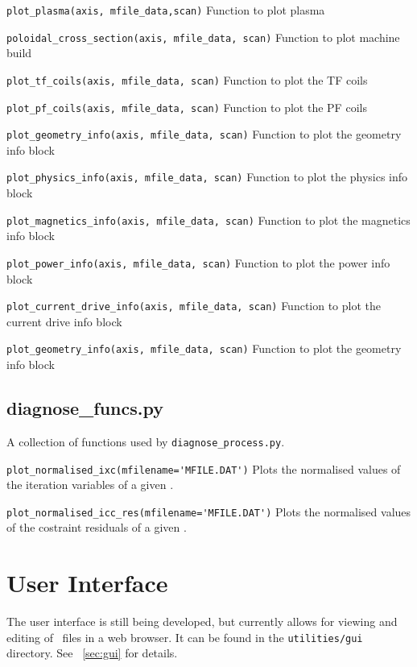 \begin{description}

\item{\verb|plot_plasma(axis, mfile_data,scan)|} Function to plot plasma

\item{\verb|poloidal_cross_section(axis, mfile_data, scan)|} Function to plot machine build

\item{\verb|plot_tf_coils(axis, mfile_data, scan)|} Function to plot the TF coils

\item{\verb|plot_pf_coils(axis, mfile_data, scan)|} Function to plot the PF coils

\item{\verb|plot_geometry_info(axis, mfile_data, scan)|} Function to plot the
  geometry info block

\item{\verb|plot_physics_info(axis, mfile_data, scan)|} Function to plot the
  physics info block

\item{\verb|plot_magnetics_info(axis, mfile_data, scan)|} Function to plot the
  magnetics info block

\item{\verb|plot_power_info(axis, mfile_data, scan)|} Function to plot the
  power info block

\item{\verb|plot_current_drive_info(axis, mfile_data, scan)|} Function to plot
  the current drive info block

\item{\verb|plot_geometry_info(axis, mfile_data, scan)|} Function to plot the
  geometry info block

\end{description}


\subsection{diagnose\_funcs.py}

A collection of functions used by \texttt{diagnose\_process.py}.

\begin{description}

\item{\verb|plot_normalised_ixc(mfilename='MFILE.DAT')|} Plots the normalised values of the iteration variables of a given \mfile.

\item{\verb|plot_normalised_icc_res(mfilename='MFILE.DAT')|} Plots the normalised values of the costraint residuals of a given \mfile.

\end{description}


\section{User Interface}

The user interface is still being developed, but currently allows for viewing
and editing of \indat\ files in a web browser. It can be found in the
\texttt{utilities/gui} directory.  See ~\ref{sec:gui} for details.


